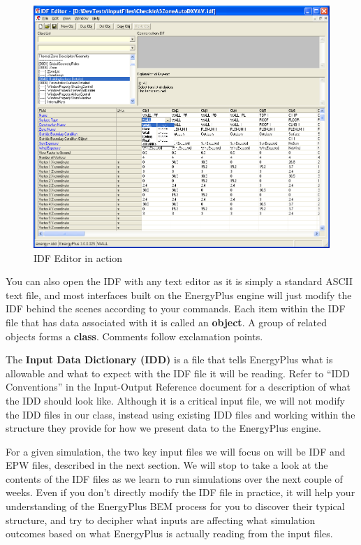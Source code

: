 \documentclass[10pt]{article}
\begin{document}
            \begin{figure}[h]
            \centering
            \includegraphics[width=5in]{extras08/IDFediting.png}
            \caption{IDF Editor in action \cite{EP9docs}}
            \label{IDFeditor}
            \end{figure}


 You can also open the IDF with any text editor as it is simply a standard ASCII text file, and most interfaces built on the EnergyPlus engine will just modify the IDF behind the scenes according to your commands. Each item within the IDF file that has data associated with it is called an \textbf{object}.  A group of related objects forms a \textbf{class}. Comments follow exclamation points. 

The \textbf{Input Data Dictionary (IDD)} is a file that tells EnergyPlus what is allowable and what to expect with the IDF file it will be reading. Refer to ``IDD Conventions'' in the Input-Output Reference document \cite{EP9docs} for a description of what the IDD should look like. Although it is a critical input file, we will not modify the IDD files in our class, instead using existing IDD files and working within the structure they provide for how we present data to the EnergyPlus engine. 

For a given simulation, the two key input files we will focus on will be IDF and EPW files, described in the next section. We will stop to take a look at the contents of the IDF files as we learn to run simulations over the next couple of weeks. Even if you don't directly modify the IDF file in practice, it will help your understanding of the EnergyPlus BEM process for you to discover their typical structure, and try to decipher what inputs are affecting what simulation outcomes based on what EnergyPlus is actually reading from the input files.
\end{document}
